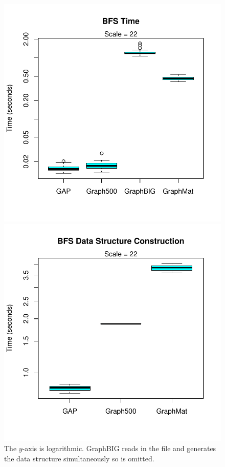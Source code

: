 \documentclass{llncs}
\begin{document}
\begin{figure}
	\centering
	\caption{The $y$-axis is logarithmic. GraphBIG reads in the file and generates the data structure simultaneously so is omitted.}
	\begin{minipage}{0.48\linewidth}
		\includegraphics[width=\linewidth, trim=0 36pt 18pt 0, clip]{graphics/bfs_time.pdf}
	\end{minipage}
	\begin{minipage}{0.48\linewidth}
		\includegraphics[width=\linewidth, trim=0 36pt 18pt 0, clip]{graphics/bfs_dsc.pdf}
	\end{minipage}
	\label{fig:bfs-time}
\end{figure}
\end{document}
